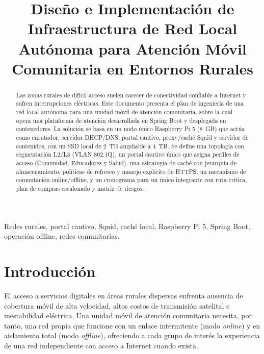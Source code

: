 \documentclass[conference]{IEEEtran}
\begin{document}
\title{Diseño e Implementación de Infraestructura de Red Local Autónoma para Atención Móvil Comunitaria en Entornos Rurales}


\author{
}

\maketitle

\begin{abstract}
Las zonas rurales de difícil acceso suelen carecer de conectividad confiable a Internet y sufren interrupciones eléctricas. Este documento presenta el plan de ingeniería de una red local autónoma para una unidad móvil de atención comunitaria, sobre la cual opera una plataforma de atención desarrollada en Spring Boot y desplegada en contenedores. La solución se basa en un nodo único Raspberry Pi 5 (8~GB) que actúa como enrutador, servidor DHCP/DNS, portal cautivo, proxy/caché Squid y servidor de contenidos, con un SSD local de 2~TB ampliable a 4~TB. Se define una topología con segmentación L2/L3 (VLAN 802.1Q), un portal cautivo único que asigna perfiles de acceso (Comunidad, Educadores y Salud), una estrategia de caché con jerarquía de almacenamiento, políticas de refresco y manejo explícito de HTTPS, un mecanismo de conmutación online/offline, y un cronograma para un único integrante con ruta crítica, plan de compras escalonado y matriz de riesgos.
\end{abstract}

\begin{IEEEkeywords}
Redes rurales, portal cautivo, Squid, caché local, Raspberry Pi 5, Spring Boot, operación offline, redes comunitarias.
\end{IEEEkeywords}

\section{Introducción}
El acceso a servicios digitales en áreas rurales dispersas enfrenta ausencia de cobertura móvil de alta velocidad, altos costos de transmisión satelital e inestabilidad eléctrica. Una unidad móvil de atención comunitaria necesita, por tanto, una red propia que funcione con un enlace intermitente (modo \textit{online}) y en aislamiento total (modo \textit{offline}), ofreciendo a cada grupo de interés la experiencia de una red independiente con acceso a Internet cuando exista.
\end{document}
